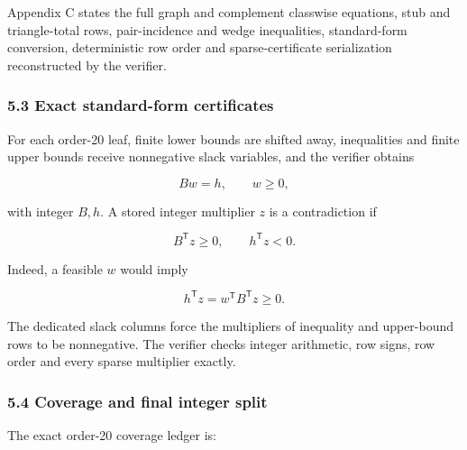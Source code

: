 \documentclass[
  english,
  11pt,
  a4paper,
]{article}
\begin{document}
Appendix C states the full graph and complement classwise equations,
stub and triangle-total rows, pair-incidence and wedge inequalities,
standard-form conversion, deterministic row order and sparse-certificate
serialization reconstructed by the verifier.

\subsubsection{5.3 Exact standard-form
certificates}\label{exact-standard-form-certificates}

For each order-20 leaf, finite lower bounds are shifted away,
inequalities and finite upper bounds receive nonnegative slack
variables, and the verifier obtains

\[
Bw=h,
\qquad
w\ge0,
\tag{5.7}
\]

with integer \(B,h\). A stored integer multiplier \(z\) is a
contradiction if

\[
B^{\mathsf T}z\ge0,
\qquad
h^{\mathsf T}z<0.
\tag{5.8}
\]

Indeed, a feasible \(w\) would imply

\[
h^{\mathsf T}z=w^{\mathsf T}B^{\mathsf T}z\ge0.
\]

The dedicated slack columns force the multipliers of inequality and
upper-bound rows to be nonnegative. The verifier checks integer
arithmetic, row signs, row order and every sparse multiplier exactly.

\subsubsection{5.4 Coverage and final integer
split}\label{coverage-and-final-integer-split}

The exact order-20 coverage ledger is:
\end{document}
